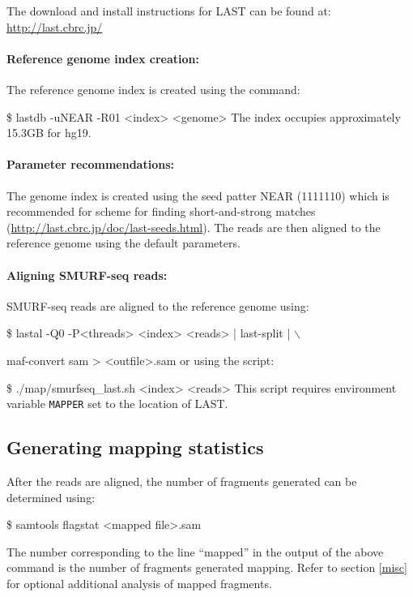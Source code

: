 \documentclass[11pt]{article}
\newenvironment{cmd}
{\list{}{
    \parsep=0em
    \itemindent=17pt
    \listparindent=50pt
    \leftmargin=0in
    \rightmargin=0in
  }\item[] \ttfamily \$}
{\endlist}
\begin{document}
The download and install instructions for LAST can be found at:
\url{http://last.cbrc.jp/}

\paragraph{Reference genome index creation:}
The reference genome index is created using the command:
\begin{cmd}
  lastdb -uNEAR -R01 <index> <genome>
\end{cmd}
The index occupies approximately 15.3GB for hg19.

\paragraph{Parameter recommendations:}
The genome index is created using the seed patter NEAR (1111110) which is
recommended for scheme for finding short-and-strong matches
(\url{http://last.cbrc.jp/doc/last-seeds.html}). The reads are then aligned
to the reference genome using the default parameters.

\paragraph{Aligning SMURF-seq reads:}
SMURF-seq reads are aligned to the reference genome using:
\begin{cmd}
  lastal -Q0 -P<threads> <index> <reads> | last-split | $\backslash$
    \par maf-convert sam > <outfile>.sam
\end{cmd}
or using the script:
\begin{cmd}
  ./map/smurfseq\_last.sh <index> <reads>
\end{cmd}
This script requires environment variable \texttt{MAPPER} set to the
location of LAST.




\subsection{Generating mapping statistics}
After the reads are aligned, the number of fragments generated can be
determined using:
\begin{cmd}
  samtools flagstat <mapped file>.sam
\end{cmd}

The number corresponding to the line ``mapped'' in the output of the above
command is the number of fragments generated
mapping. Refer to section \ref{misc} for optional additional analysis of
mapped fragments.
\end{document}
